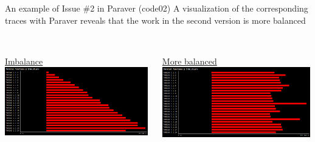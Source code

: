 \documentclass[10pt,xcolor=table]{beamer}
\begin{document}
\begin{frame}{An example of Issue \#2 in Paraver (code02)}
A visualization of the corresponding traces with Paraver reveals that the work in the second version is more balanced
\centering
\begin{columns}
\begin{column}{0.5\textwidth}
\\\underline{Imbalance}
\includegraphics[width=0.99\textwidth]{figs/Parallel_functions@trmm_v0.png}
 \end{column}
 \begin{column}{0.5\textwidth}
 \\\underline{More balanced}
\includegraphics[width=0.99\textwidth]{figs/Parallel_functions@trmm_v1.png}
 \end{column}
\end{columns}
\end{frame}
\end{document}
